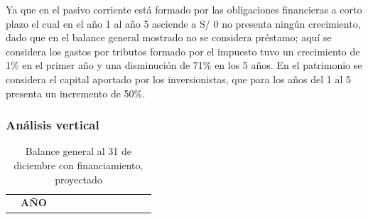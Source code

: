 \documentclass[
  stu,
  floatsintext,
  longtable,
  a4paper,
  nolmodern,
  notxfonts,
  notimes,
  colorlinks=true,linkcolor=blue,citecolor=blue,urlcolor=blue]{apa7}
\begin{document}
Ya que en el pasivo corriente está formado por las obligaciones
financieras a corto plazo el cual en el año 1 al año 5 asciende a S/ 0
no presenta ningún crecimiento, dado que en el balance general mostrado
no se considera préstamo; aquí se considera los gastos por tributos
formado por el impuesto tuvo un crecimiento de 1\% en el primer año y
una disminución de 71\% en los 5 años. En el patrimonio se considera el
capital aportado por los inversionistas, que para los años del 1 al 5
presenta un incremento de 50\%.

\subsubsection{Análisis vertical}\label{anuxe1lisis-vertical}

\begin{longtable}[]{@{}
  >{\raggedright\arraybackslash}p{}
  >{\centering\arraybackslash}p{}
  >{\centering\arraybackslash}p{}
  >{\centering\arraybackslash}p{}
  >{\centering\arraybackslash}p{}
  >{\centering\arraybackslash}p{}
  >{\raggedright\arraybackslash}p{}
  >{\centering\arraybackslash}p{}
  >{\centering\arraybackslash}p{}
  >{\centering\arraybackslash}p{}
  >{\centering\arraybackslash}p{}
  >{\centering\arraybackslash}p{}@{}}
\caption{Balance general al 31 de diciembre con financiamiento,
proyectado}\tabularnewline
\toprule\noalign{}
\begin{minipage}[b]{\linewidth}\raggedright
\end{minipage} & \begin{minipage}[b]{\linewidth}\centering
\textbf{AÑO}
\end{minipage} & \begin{minipage}[b]{\linewidth}\centering
\end{minipage} & \begin{minipage}[b]{\linewidth}\centering
\end{minipage} & \begin{minipage}[b]{\linewidth}\centering
\end{minipage} & \begin{minipage}[b]{\linewidth}\centering

\end{minipage}
\end{longtable}
\end{document}
